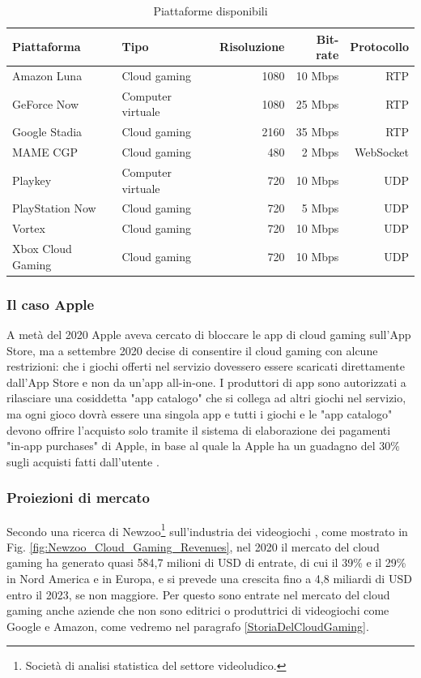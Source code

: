 \begin{table}[H]
	\centering
	\begin{tabular}{||l l r r r||} 
		\hline
		Piattaforma & Tipo & Risoluzione & Bit-rate & Protocollo \\
		\hline\hline
		Amazon Luna & Cloud gaming & 1080 & 10 Mbps & RTP \\
		\hline
		GeForce Now & Computer virtuale & 1080 & 25 Mbps & RTP \\
		\hline
		Google Stadia & Cloud gaming & 2160 & 35 Mbps & RTP \\
		\hline
		MAME CGP & Cloud gaming & 480 & 2 Mbps & WebSocket \\
		\hline
		Playkey & Computer virtuale & 720 & 10 Mbps & UDP \\
		\hline
		PlayStation Now & Cloud gaming & 720 & 5 Mbps & UDP \\
		\hline
		Vortex & Cloud gaming & 720 & 10 Mbps & UDP \\
		\hline		
		Xbox Cloud Gaming & Cloud gaming & 720 & 10 Mbps & UDP \\		
		\hline
	\end{tabular}

	\caption{Piattaforme disponibili}
	\label{table:PiattaformeDiCloudGaming}
\end{table}



\subsubsection{Il caso Apple}
A metà del 2020 Apple aveva cercato di bloccare le app di cloud gaming sull'App Store, ma a settembre 2020 decise di consentire il cloud gaming con alcune restrizioni: che i giochi offerti nel servizio dovessero essere scaricati direttamente dall'App Store e non da un'app all-in-one. I produttori di app sono autorizzati a rilasciare una cosiddetta "app catalogo" che si collega ad altri giochi nel servizio, ma ogni gioco dovrà essere una singola app e tutti i giochi e le "app catalogo" devono offrire l'acquisto solo tramite il sistema di elaborazione dei pagamenti "in‑app purchases" di Apple, in base al quale la Apple ha un guadagno del 30\% sugli acquisti fatti dall'utente \parencite{Apple_controversy}.



\subsubsection{Proiezioni di mercato}
Secondo una ricerca di Newzoo\footnote{Società di analisi statistica del settore videoludico.} sull'industria dei videogiochi \parencite{Global_Cloud_Gaming_Report}, come mostrato in Fig. \ref{fig:Newzoo_Cloud_Gaming_Revenues}, nel 2020 il mercato del cloud gaming ha generato quasi 584,7 milioni di USD di entrate, di cui il 39\% e il 29\% in Nord America e in Europa, e si prevede una crescita fino a 4,8 miliardi di USD entro il 2023, se non maggiore. Per questo sono entrate nel mercato del cloud gaming anche aziende che non sono editrici o produttrici di videogiochi come Google e Amazon, come vedremo nel paragrafo \ref{StoriaDelCloudGaming}. 

